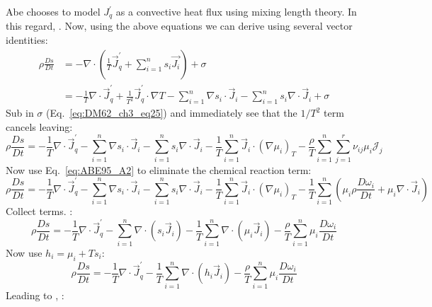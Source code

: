 Abe chooses to model $J_q^\prime$ as a convective heat flux using mixing length theory.  In this regard, \cite[Eq.~47,][]{ABE95} .  Now, using the above equations we can derive \cite[Eq.~A10,][]{ABE95} using several vector identities:
\begin{align}
\rho \frac{Ds}{Dt} &= -\nabla \cdot \left(  \frac{1}{T} \vec{J}_q^\prime + \sum_{i=1}^n s_i \vec{J_i} \right) + \sigma \\
&= - \frac{1}{T} \nabla \cdot \vec{J}_q^\prime + \frac{1}{T^2} \vec{J}_q^\prime \cdot \nabla T - \sum_{i=1}^n \nabla s_i \cdot \vec{J}_i - \sum_{i=1}^n s_i \nabla \cdot \vec{J}_i + \sigma
\end{align}
Sub in $\sigma$ (Eq.~\ref{eq:DM62_ch3_eq25}) and immediately see that the $1/T^2$ term cancels leaving:
\begin{equation}
\rho \frac{Ds}{Dt} = - \frac{1}{T} \nabla \cdot \vec{J}_q^\prime - \sum_{i=1}^n \nabla s_i \cdot \vec{J}_i - \sum_{i=1}^n s_i \nabla \cdot \vec{J}_i - \frac{1}{T} \sum_{i=1}^n \vec{J}_i \cdot (\nabla \mu_i)_T - \frac{\rho}{T} \sum_{i=1}^n \sum_{j=1}^r \nu_{ij} \mu_i \mathcal{J}_j
\end{equation}
Now use Eq.~\ref{eq:ABE95_A2} to eliminate the chemical reaction term:
\begin{equation}
\rho \frac{Ds}{Dt} = - \frac{1}{T} \nabla \cdot \vec{J}_q^\prime - \sum_{i=1}^n \nabla s_i \cdot \vec{J}_i - \sum_{i=1}^n s_i \nabla \cdot \vec{J}_i - \frac{1}{T} \sum_{i=1}^n \vec{J}_i \cdot (\nabla \mu_i)_T - \frac{1}{T} \sum_{i=1}^n \left( \mu_i \rho \frac{D\omega_i}{Dt} +\mu_i \nabla \cdot \vec{J}_i \right)
\end{equation}
Collect terms.  :
\begin{equation}
\rho \frac{Ds}{Dt} = - \frac{1}{T} \nabla \cdot \vec{J}_q^\prime - \sum_{i=1}^n \nabla \cdot (s_i \vec{J}_i ) - \frac{1}{T} \sum_{i=1}^n \nabla \cdot (\mu_i \vec{J}_i) - \frac{\rho}{T} \sum_{i=1}^n \mu_i  \frac{D\omega_i}{Dt}
\end{equation}
Now use $h_i = \mu_i + T s_i$:
\begin{equation}
\rho \frac{Ds}{Dt} = - \frac{1}{T} \nabla \cdot \vec{J}_q^\prime - \frac{1}{T} \sum_{i=1}^n \nabla \cdot (h_i \vec{J}_i ) - \frac{\rho}{T} \sum_{i=1}^n \mu_i  \frac{D\omega_i}{Dt}
\end{equation}
Leading to \cite[Eq.~A10,][]{ABE95}, :
